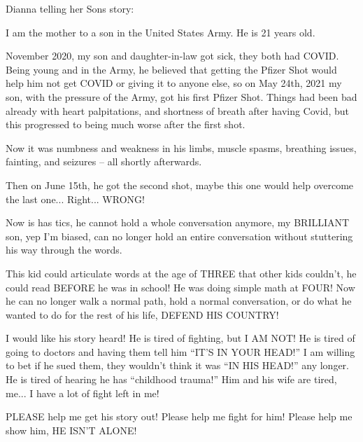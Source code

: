 Dianna telling her Sons story:

I am the mother to a son in the United States Army. He is 21 years old.

November 2020, my son and daughter-in-law got sick, they both had COVID. Being
young and in the Army, he believed that getting the Pfizer Shot would help him
not get COVID or giving it to anyone else, so on May 24th, 2021 my son, with the
pressure of the Army, got his first Pfizer Shot. Things had been bad already
with heart palpitations, and shortness of breath after having Covid, but this
progressed to being much worse after the first shot.

Now it was numbness and weakness in his limbs, muscle spasms, breathing issues,
fainting, and seizures – all shortly afterwards.

Then on June 15th, he got the second shot, maybe this one would help overcome
the last one... Right... WRONG!

Now is has tics, he cannot hold a whole conversation anymore, my BRILLIANT son,
yep I’m biased, can no longer hold an entire conversation without stuttering his
way through the words.

This kid could articulate words at the age of THREE that other kids couldn’t, he
could read BEFORE he was in school! He was doing simple math at FOUR! Now he can
no longer walk a normal path, hold a normal conversation, or do what he wanted
to do for the rest of his life, DEFEND HIS COUNTRY!

I would like his story heard! He is tired of fighting, but I AM NOT! He is tired
of going to doctors and having them tell him “IT’S IN YOUR HEAD!” I am willing
to bet if he sued them, they wouldn’t think it was “IN HIS HEAD!” any longer. He
is tired of hearing he has “childhood trauma!” Him and his wife are tired,
me... I have a lot of fight left in me!

PLEASE help me get his story out! Please help me fight for him! Please help me
show him, HE ISN’T ALONE!
